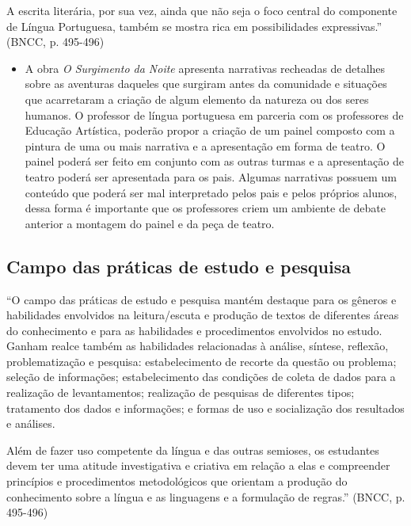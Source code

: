 \documentclass[12pt]{extarticle}
\begin{document}
A escrita literária, por sua vez, ainda que não seja o foco central do
componente de Língua Portuguesa, também se mostra rica em possibilidades
expressivas.'' (BNCC, p. 495-496)

\begin{itemize}
\item
  A obra \emph{O Surgimento da Noite} apresenta narrativas recheadas de
  detalhes sobre as aventuras daqueles que surgiram antes da comunidade
  e situações que acarretaram a criação de algum elemento da natureza ou
  dos seres humanos. O professor de língua portuguesa em parceria com os
  professores de Educação Artística, poderão propor a criação de um
  painel composto com a pintura de uma ou mais narrativa e a
  apresentação em forma de teatro. O painel poderá ser feito em conjunto
  com as outras turmas e a apresentação de teatro poderá ser apresentada
  para os pais. Algumas narrativas possuem um conteúdo que poderá ser
  mal interpretado pelos pais e pelos próprios alunos, dessa forma é
  importante que os professores criem um ambiente de debate anterior a
  montagem do painel e da peça de teatro.
\end{itemize}

\subsection{Campo das práticas de estudo e pesquisa }

``O campo das práticas de estudo e pesquisa mantém destaque para os
gêneros e habilidades envolvidos na leitura/escuta e produção de textos
de diferentes áreas do conhecimento e para as habilidades e
procedimentos envolvidos no estudo. Ganham realce também as habilidades
relacionadas à análise, síntese, reflexão, problematização e pesquisa:
estabelecimento de recorte da questão ou problema; seleção de
informações; estabelecimento das condições de coleta de dados para a
realização de levantamentos; realização de pesquisas de diferentes
tipos; tratamento dos dados e informações; e formas de uso e
socialização dos resultados e análises.

Além de fazer uso competente da língua e das outras semioses, os
estudantes devem ter uma atitude investigativa e criativa em relação a
elas e compreender princípios e procedimentos metodológicos que orientam
a produção do conhecimento sobre a língua e as linguagens e a formulação
de regras.'' (BNCC, p. 495-496)
\end{document}
